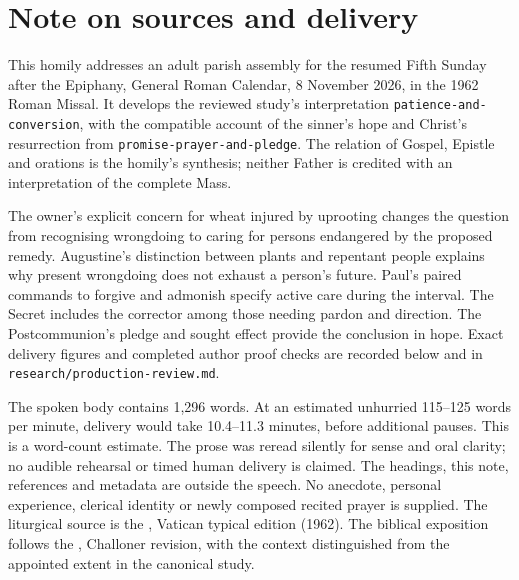 \section{Note on sources and delivery}
This homily addresses an adult parish assembly for the resumed Fifth Sunday
after the Epiphany, General Roman Calendar, 8 November 2026, in the 1962
Roman Missal. It develops the reviewed study's interpretation
\texttt{patience-and-conversion}, with the compatible account of the
sinner's hope and Christ's resurrection from
\texttt{promise-prayer-and-pledge}. The relation of Gospel, Epistle and
orations is the homily's synthesis; neither Father is credited with an
interpretation of the complete Mass.

The owner's explicit concern for wheat injured by uprooting changes the
question from recognising wrongdoing to caring for persons endangered by
the proposed remedy. Augustine's distinction between plants and repentant
people explains why present wrongdoing does not exhaust a person's future.
Paul's paired commands to forgive and admonish specify active care during
the interval. The Secret includes the corrector among those needing pardon
and direction. The Postcommunion's pledge and sought effect provide the
conclusion in hope. Exact delivery figures and completed author proof
checks are recorded below and in \texttt{research/production-review.md}.

The spoken body contains 1,296 words. At an estimated unhurried
115--125 words per minute, delivery would take 10.4--11.3 minutes, before
additional pauses. This is a word-count estimate. The prose was reread
silently for sense and oral clarity; no audible rehearsal or timed human
delivery is claimed. The headings, this note, references and metadata
are outside the speech. No anecdote, personal experience, clerical
identity or newly composed recited prayer is supplied. The liturgical
source is the , Vatican typical edition (1962).
The biblical exposition follows the ,
Challoner revision, with the context distinguished from the appointed
extent in the canonical study.

